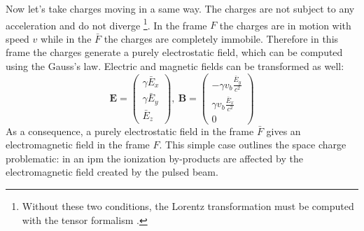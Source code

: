 \begin{refsection}
  Now let's take charges moving in a same way. The charges are not subject to any acceleration and do not diverge \footnote{Without these two conditions, the Lorentz transformation must be computed with the tensor formalism \cite{feynman2011feynman}.}. In the frame $F$ the charges are in motion with speed $v$ while in the $\bar{F}$ the charges are completely immobile. Therefore in this frame the charges generate a purely electrostatic field, which can be computed using the Gauss's law.
  Electric and magnetic fields can be transformed as well:
  \begin{equation}
    \label{chap3:eqn:Elorentz}
    \boldsymbol{E} =
    \begin{pmatrix}
      \gamma \bar{E}_{x} \\
      \gamma \bar{E}_{y} \\
      \bar{E}_{z}
    \end{pmatrix}
    ,\
    \boldsymbol{B} =
    \begin{pmatrix}
      -\gamma v_{b} \frac{\bar{E}_y}{c^{2}} \\
      \gamma v_{b} \frac{\bar{E}_x}{c^{2}}  \\
      0
    \end{pmatrix}
  \end{equation}
  As a consequence, a purely electrostatic field in the frame $\bar{F}$ gives an electromagnetic field in the frame $F$. This simple case outlines the space charge problematic: in an \acrshort{ipm} the ionization by-products are affected by the electromagnetic field created by the pulsed beam.


\end{refsection}
